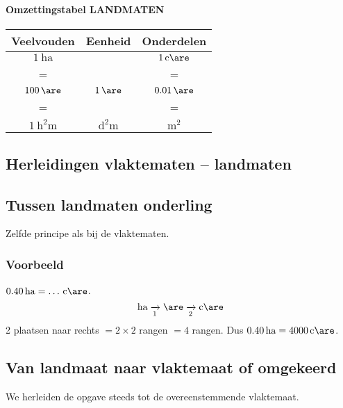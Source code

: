 \documentclass[a4paper,12pt]{article}
\begin{document}
\paragraph{Omzettingstabel LANDMATEN}
\renewcommand{\arraystretch}{1.2}
\begin{center}
\setlength{\fboxsep}{4pt}\setlength{\fboxrule}{0.5pt}%
\begin{tabular}{*{3}{c}}
  \textbf{Veelvouden} & \textbf{Eenheid} & \textbf{Onderdelen} \\
  \midrule
  \(\SI{1}{\hectare}\)                &                  & \(\SI{1}{\centi\are}\)                \\
  =                   &                  & =                   \\
  \(\SI{100}{\are}\)               & \textbf{\(\SI{1}{\are}\)}     & \(\SI{0.01}{\are}\)              \\
  =                   &                  & =                   \\
  \(\SI{1}{\square\hecto\metre}\)            & \(\si{\square\deca\metre}\)          & \(\si{\square\metre}\)
\end{tabular}
\end{center}

\subsection{Herleidingen vlaktematen -- landmaten}

\subsection*{Tussen landmaten onderling}

Zelfde principe als bij de vlaktematen.

\subsubsection*{Voorbeeld}
\(\SI{0.40}{\hectare}=\ldots\,\si{\centi\are}\).
\[
\si{\hectare} \xrightarrow[1]{} \si{\are} \xrightarrow[2]{} \si{\centi\are}
\]
2 plaatsen naar rechts \(=2\times2\) rangen \(=4\) rangen. Dus \(\SI{0.40}{\hectare}=\SI{4000}{\centi\are}\).

\subsection*{Van landmaat naar vlaktemaat of omgekeerd}
We herleiden de opgave steeds tot de overeenstemmende vlaktemaat.
\end{document}
